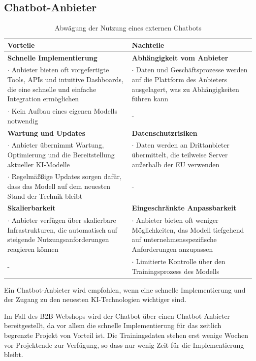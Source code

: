 \documentclass[%
	12pt,
	a4paper,
	oneside,
	parskip=full
]{scrbook}
\begin{document}
\subsection{Chatbot-Anbieter}
\begin{table}[ht]
	\centering
	\begin{tabularx}{\textwidth}{X|X}
		Vorteile & Nachteile \\ \hline \hline
		\textbf{Schnelle Implementierung} & \textbf{Abhängigkeit vom Anbieter} \\
		$\cdot$ Anbieter bieten oft vorgefertigte Tools, APIs und intuitive Dashboards, die eine schnelle und einfache Integration ermöglichen & $\cdot$ Daten und Geschäftsprozesse werden auf die Plattform des Anbieters ausgelagert, was zu Abhängigkeiten führen kann\\
		$\cdot$ Kein Aufbau eines eigenen Modells notwendig & -\\ \hline
		\textbf{Wartung und Updates} & \textbf{Datenschutzrisiken} \\
		$\cdot$ Anbieter übernimmt Wartung, Optimierung und die Bereitstellung aktueller KI-Modelle & $\cdot$ Daten werden an Drittanbieter übermittelt, die teilweise Server außerhalb der EU verwenden \\
		$\cdot$ Regelmäßßige Updates sorgen dafür, dass das Modell auf dem neuesten Stand der Technik bleibt & - \\ \hline
		\textbf{Skalierbarkeit} & \textbf{Eingeschränkte Anpassbarkeit}\\
		$\cdot$ Anbieter verfügen über skalierbare Infrastrukturen, die automatisch auf steigende Nutzungsanforderungen reagieren können & $\cdot$ Anbieter bieten oft weniger Möglichkeiten, das Modell tiefgehend auf unternehmensspezifische Anforderungen anzupassen\\
		- & $\cdot$ Limitierte Kontrolle über den Trainingsprozess des Modells\\
	\end{tabularx}
	\caption{Abwägung der Nutzung eines externen Chatbots}
\end{table}
Ein Chatbot-Anbieter wird empfohlen, wenn eine schnelle Implementierung und der Zugang zu den neuesten KI-Technologien wichtiger sind.

Im Fall des B2B-Webshops wird der Chatbot über einen Chatbot-Anbieter bereitgestellt, da vor allem die schnelle Implementierung für das zeitlich begrenzte Projekt von Vorteil ist. Die Trainingsdaten stehen erst wenige Wochen vor Projektende zur Verfügung, so dass nur wenig Zeit für die Implementierung bleibt.
\end{document}
